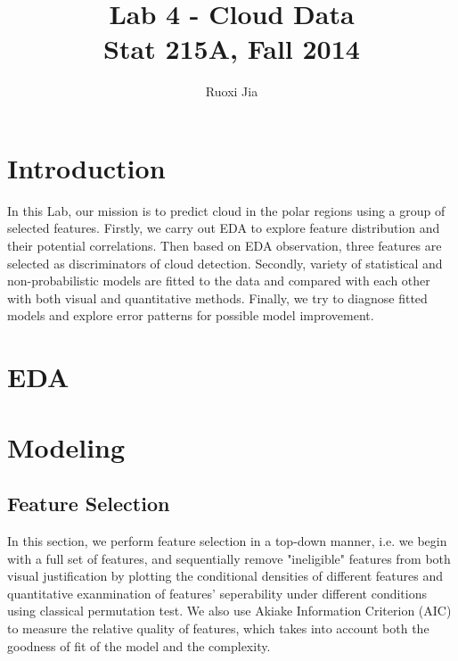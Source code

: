 \documentclass[english]{article}\usepackage{graphicx, color}
\numberwithin{equation}{section}
\numberwithin{figure}{section}
\begin{document}
\title{Lab 4 - Cloud Data\\
Stat 215A, Fall 2014}


\author{Ruoxi Jia}

\maketitle
\section{Introduction}
In this Lab, our mission is to predict cloud in the polar regions using a group of selected features. Firstly, we carry out EDA to explore feature distribution and their potential correlations. Then based on EDA observation, three features are selected as discriminators of cloud detection. Secondly, variety of  statistical and non-probabilistic models are fitted to the data and compared with each other with both visual and quantitative methods. Finally, we try to diagnose fitted models and explore error patterns for possible model improvement.

\section{EDA}


\section{Modeling}

\subsection{Feature Selection}
In this section, we perform feature selection in a top-down manner, i.e. we begin with a full set of features, and sequentially remove "ineligible" features from both visual justification by plotting the conditional densities of different features and quantitative exanmination of features' seperability under different conditions using classical permutation test. We also use Akiake Information Criterion (AIC) to measure the relative quality of features, which takes into account both the goodness of fit of the model and the complexity.\\
\end{document}
